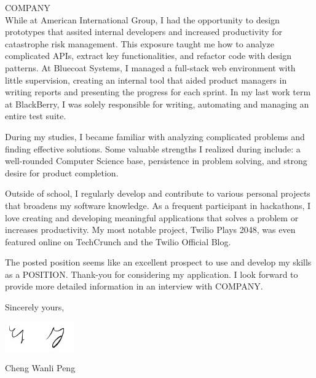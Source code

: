 \documentclass[11pt]{letter} %
\begin{document}
\begin{letter}{ 
COMPANY \\
}
While at American International Group, I had the opportunity to design prototypes that assited internal developers and increased productivity for catastrophe risk management. This exposure taught me how to analyze complicated APIs, extract key functionalities, and refactor code with design patterns. At Bluecoat Systems, I managed a full-stack web environment with little supervision, creating an internal tool that aided product managers in writing reports and presenting the progress for each sprint. In my last work term at BlackBerry, I was solely responsible for writing, automating and managing an entire test suite. 

During my studies, I became familiar with analyzing complicated problems and finding effective solutions. Some valuable strengths I realized during include: a well-rounded Computer Science base, persistence in problem solving, and strong desire for product completion.

Outside of school, I regularly develop and contribute to various personal projects that broadens my software knowledge. As a frequent participant in hackathons, I love creating and developing meaningful applications that solves a problem or increases productivity. My most notable project, Twilio Plays 2048, was even featured online on TechCrunch and the Twilio Official Blog.

The posted position seems like an excellent prospect to use and develop my skills as a POSITION. Thank-you for considering my application. I look forward to provide more detailed information in an interview with COMPANY.

Sincerely yours,

\includegraphics{signature}

Cheng Wanli Peng 


\end{letter}
\end{document}
